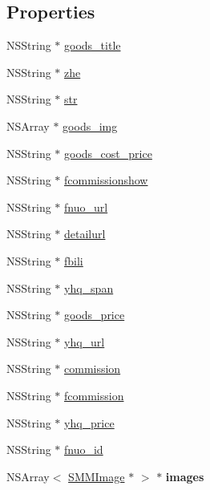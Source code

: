 \subsection*{Properties}
\begin{DoxyCompactItemize}
\item 
N\+S\+String $\ast$ \mbox{\hyperlink{interface_f_n_share_mutiply_model_a1d38e88072ef10385aca55bffacc49b4}{goods\+\_\+title}}
\item 
N\+S\+String $\ast$ \mbox{\hyperlink{interface_f_n_share_mutiply_model_a9335a8cd25dc79c5b53052d0b6d3678a}{zhe}}
\item 
N\+S\+String $\ast$ \mbox{\hyperlink{interface_f_n_share_mutiply_model_ad21158e1c78bcb6f5d0887c42e25d6db}{str}}
\item 
N\+S\+Array $\ast$ \mbox{\hyperlink{interface_f_n_share_mutiply_model_a0a0415ec43f92e660ecc47f2270ee9ec}{goods\+\_\+img}}
\item 
N\+S\+String $\ast$ \mbox{\hyperlink{interface_f_n_share_mutiply_model_a54c3f951bb537e238c287c7b71ceeed0}{goods\+\_\+cost\+\_\+price}}
\item 
N\+S\+String $\ast$ \mbox{\hyperlink{interface_f_n_share_mutiply_model_af122b0cba18caa9877dee31a4553aad7}{fcommissionshow}}
\item 
N\+S\+String $\ast$ \mbox{\hyperlink{interface_f_n_share_mutiply_model_accc9a18b650f3621e328563294a07c74}{fnuo\+\_\+url}}
\item 
N\+S\+String $\ast$ \mbox{\hyperlink{interface_f_n_share_mutiply_model_aa5fa41da839f5afc500271c4126d92c2}{detailurl}}
\item 
N\+S\+String $\ast$ \mbox{\hyperlink{interface_f_n_share_mutiply_model_a8285a8dbb9e382fcf38546678b0df0a7}{fbili}}
\item 
N\+S\+String $\ast$ \mbox{\hyperlink{interface_f_n_share_mutiply_model_a2f4026150dec000c85a9e60e61424b95}{yhq\+\_\+span}}
\item 
N\+S\+String $\ast$ \mbox{\hyperlink{interface_f_n_share_mutiply_model_aabf80653537e2cfe83acdf27a9b4b9fe}{goods\+\_\+price}}
\item 
N\+S\+String $\ast$ \mbox{\hyperlink{interface_f_n_share_mutiply_model_acaa645e6102b5c4e4ae7f0e5eead5439}{yhq\+\_\+url}}
\item 
N\+S\+String $\ast$ \mbox{\hyperlink{interface_f_n_share_mutiply_model_a31edd86a1238f4405de29215e03295d6}{commission}}
\item 
N\+S\+String $\ast$ \mbox{\hyperlink{interface_f_n_share_mutiply_model_a0059fcb5b85b22cf9f059770db87eacd}{fcommission}}
\item 
N\+S\+String $\ast$ \mbox{\hyperlink{interface_f_n_share_mutiply_model_a91372beb5ff0de15d31d4ee1c9bbe3d3}{yhq\+\_\+price}}
\item 
N\+S\+String $\ast$ \mbox{\hyperlink{interface_f_n_share_mutiply_model_acf73a5c9ce1a3911a07b7316a767a5df}{fnuo\+\_\+id}}
\item 
\mbox{\label{interface_f_n_share_mutiply_model_ab09a3cf40d2f9f3bdd0e9e6db72cf053}} 
N\+S\+Array$<$ \mbox{\hyperlink{interface_s_m_m_image}{S\+M\+M\+Image}} $\ast$ $>$ $\ast$ {\bfseries images}
\end{DoxyCompactItemize}


